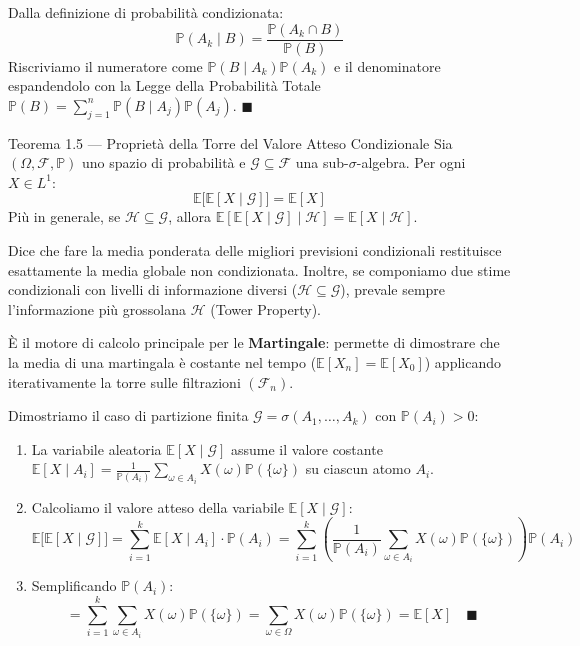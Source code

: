 \documentclass[11pt,a4paper]{report}
\newcommand{\PP}{\mathbb{P}}
\newcommand{\E}{\mathbb{E}}
\newcommand{\F}{\mathcal{F}}
\newcommand{\G}{\mathcal{G}}
\newcommand{\1}{\mathbf{1}}
\begin{document}
\begin{dimostrazione}
Dalla definizione di probabilità condizionata:
\[ \PP(A_k \mid B) = \frac{\PP(A_k \cap B)}{\PP(B)} \]
Riscriviamo il numeratore come $\PP(B \mid A_k)\PP(A_k)$ e il denominatore espandendolo con la Legge della Probabilità Totale $\PP(B) = \sum_{j=1}^n \PP(B \mid A_j)\PP(A_j)$. $\blacksquare$
\end{dimostrazione}

\newpage

\begin{teoremabox}{Teorema 1.5 --- Proprietà della Torre del Valore Atteso Condizionale}
Sia $(\Omega, \F, \PP)$ uno spazio di probabilità e $\G \subseteq \F$ una sub-$\sigma$-algebra. Per ogni $X \in L^1$:
\[ \E\big[\E[X \mid \G]\big] = \E[X] \]
Più in generale, se $\mathcal{H} \subseteq \G$, allora $\E[\E[X \mid \G] \mid \mathcal{H}] = \E[X \mid \mathcal{H}]$.
\end{teoremabox}

\begin{cosafa}
Dice che fare la media ponderata delle migliori previsioni condizionali restituisce esattamente la media globale non condizionata. Inoltre, se componiamo due stime condizionali con livelli di informazione diversi ($\mathcal{H} \subseteq \G$), prevale sempre l'informazione più grossolana $\mathcal{H}$ (Tower Property).
\end{cosafa}

\begin{acosaserve}
È il motore di calcolo principale per le \textbf{Martingale}: permette di dimostrare che la media di una martingala è costante nel tempo ($\E[X_n] = \E[X_0]$) applicando iterativamente la torre sulle filtrazioni $(\F_n)$.
\end{acosaserve}

\begin{dimostrazione}
Dimostriamo il caso di partizione finita $\G = \sigma(A_1, \dots, A_k)$ con $\PP(A_i) > 0$:
\begin{enumerate}
    \item La variabile aleatoria $\E[X \mid \G]$ assume il valore costante $\E[X \mid A_i] = \frac{1}{\PP(A_i)}\sum_{\omega \in A_i} X(\omega)\PP(\{\omega\})$ su ciascun atomo $A_i$.
    \item Calcoliamo il valore atteso della variabile $\E[X \mid \G]$:
    \[ \E\big[\E[X \mid \G]\big] = \sum_{i=1}^k \E[X \mid A_i] \cdot \PP(A_i) = \sum_{i=1}^k \left( \frac{1}{\PP(A_i)} \sum_{\omega \in A_i} X(\omega)\PP(\{\omega\}) \right) \PP(A_i) \]
    \item Semplificando $\PP(A_i)$:
    \[ = \sum_{i=1}^k \sum_{\omega \in A_i} X(\omega)\PP(\{\omega\}) = \sum_{\omega \in \Omega} X(\omega)\PP(\{\omega\}) = \E[X] \quad \blacksquare \]
\end{enumerate}
\end{dimostrazione}
\end{document}
